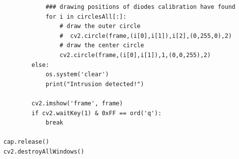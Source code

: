 \documentclass[a4paper,12pt, projekat]{etf}
\begin{document}
\begin{verbatim}
            ### drawing positions of diodes calibration have found
            for i in circlesAll[:]:
                # draw the outer circle
                #  cv2.circle(frame,(i[0],i[1]),i[2],(0,255,0),2)
                # draw the center circle
                cv2.circle(frame,(i[0],i[1]),1,(0,0,255),2)
        else:
            os.system('clear')
            print("Intrusion detected!")

        cv2.imshow('frame', frame)
        if cv2.waitKey(1) & 0xFF == ord('q'):
            break

cap.release()
cv2.destroyAllWindows()

\end{verbatim}
\end{document}
